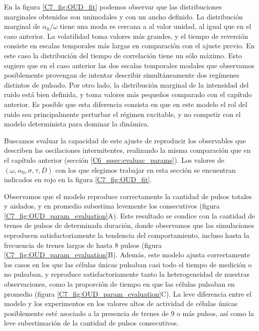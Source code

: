 \documentclass[./main.tex]{subfiles}
\begin{document}
En la figura \ref{C7_fig:OUD_fit} podemos observar que las distribuciones marginales obtenidas son unimodales y con un ancho definido.
La distribución marginal de $\alpha_0/\omega$ tiene una moda es cercana a al valor unidad, al igual que en el caso anterior. La volatilidad toma valores más grandes, y el tiempo de reversión consiste en escalas temporales más largas en comparación con el ajuste previo. En este caso la distribución del tiempo de correlación tiene un sólo máximo. Esto sugiere que en el caso anterior las dos escalas temporales modales que observamos posiblemente provengan de intentar describir simultáneamente dos regímenes distintos de pulsado. Por otro lado, la distribución marginal de la intensidad del ruido está bien definida, y toma valores más pequeños comparado con el capítulo anterior. Es posible que esta diferencia consista en que en este modelo el rol del ruido sea principalmente perturbar el régimen excitable, y no competir con el modelo determinista para dominar la dinámica. 


Buscamos evaluar la capacidad de este ajuste de reproducir los observables que describen las oscilaciones intermitentes, realizando la misma comparación que en el capítulo anterior (sección \ref{C6_sssec:evaluac_params}). Los valores de $(\omega,\alpha_0,\sigma,\tau,D)$ con los que elegimos trabajar en esta sección se encuentran indicados en rojo en la figura \ref{C7_fig:OUD_fit}. 

Observamos que el modelo reproduce correctamente la cantidad de pulsos totales y aislados, y en promedio subestima levemente los consecutivos (figura \ref{C7_fig:OUD_param_evaluation}A). Este resultado se condice con la cantidad de trenes de pulsos de determinada duración, donde observamos que las simulaciones reproducen satisfactoriamente la tendencia del comportamiento, incluso hasta la frecuencia de trenes largos de hasta $8$ pulsos (figura \ref{C7_fig:OUD_param_evaluation}B). Además, este modelo ajusta correctamente los casos en los que las células únicas pulsaban casi todo el tiempo de medición o no pulsaban, y reproduce satisfactoriamente tanto la heterogeneidad de nuestras observaciones, como la proporción de tiempo en que las células pulsaban en promedio (figura \ref{C7_fig:OUD_param_evaluation}C). La leve diferencia  entre el modelo y los experimentos en los valores altos de actividad de células únicas posiblemente esté asociado a la presencia de trenes de $9$ o más pulsos, así como la leve subestimación de la cantidad de pulsos consecutivos. 
\end{document}
